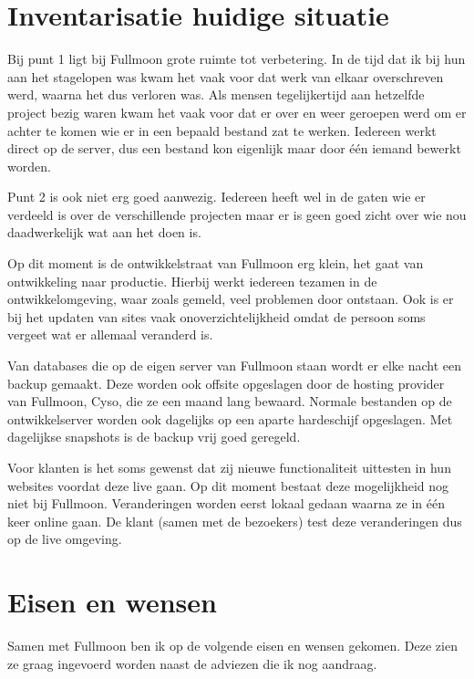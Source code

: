 \documentclass[12pt,a4paper]{article}
\begin{document}
  \section{Inventarisatie huidige situatie}
  
  Bij punt 1 ligt bij Fullmoon grote ruimte tot verbetering. In de tijd dat ik bij hun aan het stagelopen was kwam het vaak voor dat werk van elkaar overschreven werd, waarna het dus verloren was. Als mensen tegelijkertijd aan hetzelfde project bezig waren kwam het vaak voor dat er over en weer geroepen werd om er achter te komen wie er in een bepaald bestand zat te werken. Iedereen werkt direct op de server, dus een bestand kon eigenlijk maar door \'{e}\'{e}n iemand bewerkt worden.
  
  Punt 2 is ook niet erg goed aanwezig. Iedereen heeft wel in de gaten wie er verdeeld is over de verschillende projecten maar er is geen goed zicht over wie nou daadwerkelijk wat aan het doen is.
  
  Op dit moment is de ontwikkelstraat van Fullmoon erg klein, het gaat van ontwikkeling naar productie. Hierbij werkt iedereen tezamen in de ontwikkelomgeving, waar zoals gemeld, veel problemen door ontstaan. Ook is er bij het updaten van sites vaak onoverzichtelijkheid omdat de persoon soms vergeet wat er allemaal veranderd is.
  
  Van databases die op de eigen server van Fullmoon staan wordt er elke nacht een backup gemaakt. Deze worden ook offsite opgeslagen door de hosting provider van Fullmoon, Cyso, die ze een maand lang bewaard. Normale bestanden op de ontwikkelserver worden ook dagelijks op een aparte hardeschijf opgeslagen. Met dagelijkse snapshots is de backup vrij goed geregeld.
  
  Voor klanten is het soms gewenst dat zij nieuwe functionaliteit uittesten in hun websites voordat deze live gaan. Op dit moment bestaat deze mogelijkheid nog niet bij Fullmoon. Veranderingen worden eerst lokaal gedaan waarna ze in \'{e}\'{e}n keer online gaan. De klant (samen met de bezoekers) test deze veranderingen dus op de live omgeving.

  \section{Eisen en wensen}
  
  Samen met Fullmoon ben ik op de volgende eisen en wensen gekomen. Deze zien ze graag ingevoerd worden naast de adviezen die ik nog aandraag.
  
\end{document}
